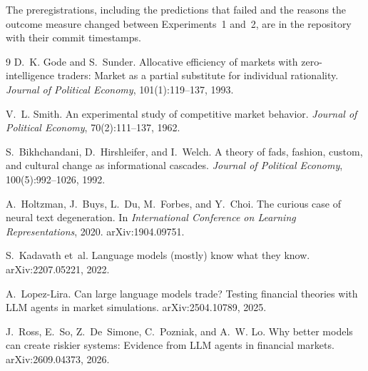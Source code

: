 \documentclass[11pt]{article}
\begin{document}
The preregistrations, including the predictions that failed and the reasons the
outcome measure changed between Experiments~1 and~2, are in the repository with
their commit timestamps.


\begin{thebibliography}{9}
D.~K. Gode and S.~Sunder.
\newblock Allocative efficiency of markets with zero-intelligence traders:
  Market as a partial substitute for individual rationality.
\newblock \emph{Journal of Political Economy}, 101(1):119--137, 1993.

V.~L. Smith.
\newblock An experimental study of competitive market behavior.
\newblock \emph{Journal of Political Economy}, 70(2):111--137, 1962.

S.~Bikhchandani, D.~Hirshleifer, and I.~Welch.
\newblock A theory of fads, fashion, custom, and cultural change as
  informational cascades.
\newblock \emph{Journal of Political Economy}, 100(5):992--1026, 1992.

A.~Holtzman, J.~Buys, L.~Du, M.~Forbes, and Y.~Choi.
\newblock The curious case of neural text degeneration.
\newblock In \emph{International Conference on Learning Representations}, 2020.
\newblock arXiv:1904.09751.

S.~Kadavath et~al.
\newblock Language models (mostly) know what they know.
\newblock arXiv:2207.05221, 2022.

A.~Lopez-Lira.
\newblock Can large language models trade? Testing financial theories with LLM
  agents in market simulations.
\newblock arXiv:2504.10789, 2025.

J.~Ross, E.~So, Z.~De~Simone, C.~Pozniak, and A.~W. Lo.
\newblock Why better models can create riskier systems: Evidence from LLM
  agents in financial markets.
\newblock arXiv:2609.04373, 2026.
\end{thebibliography}
\end{document}

